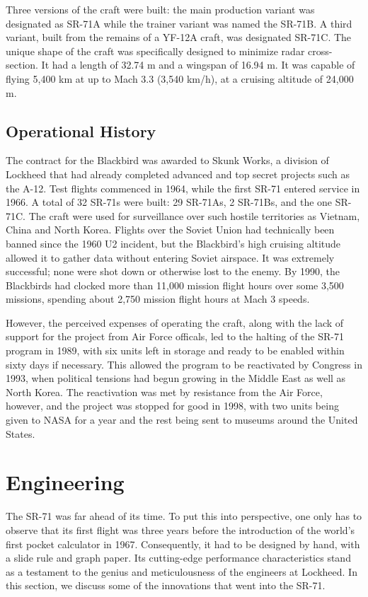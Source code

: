 \documentclass[12pt, draftclsnofoot, onecolumn, doublespaced]{IEEEtran}
\begin{document}
	Three versions of the craft were built: the main production variant was designated as SR-71A while the trainer variant was named the SR-71B. A third variant, built from the remains of a YF-12A craft, was designated SR-71C.
	The unique shape of the craft was specifically designed to minimize radar cross-section. It had a length of 32.74 m and a wingspan of 16.94 m. It was capable of flying 5,400 km at up to Mach 3.3 (3,540 km/h), at a cruising altitude of 24,000 m.


	\subsection{Operational History}
	The contract for the Blackbird was awarded to Skunk Works, a division of Lockheed that had already completed advanced and top secret projects such as the A-12. Test flights commenced in 1964, while the first SR-71 entered service in 1966. A total of 32 SR-71s were built: 29 SR-71As, 2 SR-71Bs, and the one SR-71C. The craft were used for surveillance over such hostile territories as Vietnam, China and North Korea. Flights over the Soviet Union had technically been banned since the 1960 U2 incident, but the Blackbird's high cruising altitude allowed it to gather data without entering Soviet airspace. It was extremely successful; none were shot down or otherwise lost to the enemy. By 1990, the Blackbirds had clocked more than 11,000 mission flight hours over some 3,500 missions, spending about 2,750 mission flight hours at Mach 3 speeds\cite{stats}.

	However, the perceived expenses of operating the craft, along with the lack of support for the project from Air Force officals, led to the halting of the SR-71 program in 1989, with six units left in storage and ready to be enabled within sixty days if necessary. This allowed the program to be reactivated by Congress in 1993, when political tensions had begun growing in the Middle East as well as North Korea. The reactivation was met by resistance from the Air Force, however, and the project was stopped for good in 1998, with two units being given to NASA for a year and the rest being sent to museums around the United States.

	
\section{Engineering}

The SR-71 was far ahead of its time. To put this into perspective, one only has to observe that its first flight was three years before the introduction of the world's first pocket calculator in 1967. Consequently, it had to be designed by hand, with a slide rule and graph paper. Its cutting-edge performance characteristics stand as a testament to the genius and meticulousness of the engineers at Lockheed. In this section, we discuss some of the innovations that went into the SR-71.
\end{document}
